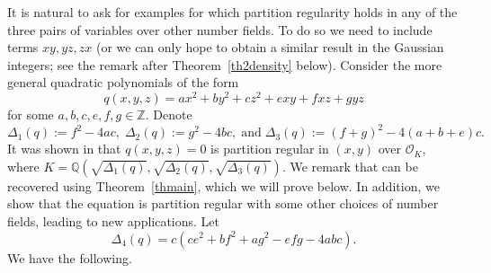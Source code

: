\documentclass[11pt]{amsart}
\newtheorem{corollary}[lemma]{Corollary}
\theoremstyle{definition}
\newcommand{\Q}{{\mathbb Q}}
\newcommand{\Z}{{\mathbb Z}}
\newcommand{\AK}[1]{{\color{ForestGreen}{{#1}}}}
\begin{document}
 




   
 It is natural to ask for examples for which partition regularity holds in any of the three pairs of variables over other number fields. To do so we need to include terms $xy,yz, zx$ (or we can only hope to obtain a similar result in the Gaussian integers; see the remark after Theorem~\ref{th2density} below). Consider the more general quadratic polynomials of the form
\begin{equation}\label{fp}
    q(x,y,z)=ax^{2}+by^{2}+cz^{2}+exy+fxz+gyz
\end{equation}
for some $a,b,c,e,f,g\in\Z$. Denote 
$$\Delta_{1}(q):=f^{2}-4ac,\; \Delta_{2}(q):=g^{2}-4bc,\;\text{and}\; \Delta_{3}(q):=(f+g)^{2}-4(a+b+e)c.$$
It was shown in \cite[Proposition~10.4]{S23} that $q(x,y,z)=0$ is partition regular in $(x,y)$ over $\mathcal{O}_{K}$, where $K=\Q(\sqrt{\Delta_{1}(q)},\sqrt{\Delta_{2}(q)},\sqrt{\Delta_{3}(q)})$. We remark that
\cite[Proposition~10.4]{S23} can be recovered using Theorem~\ref{thmain}, which we will prove below. In addition,
  we show that the equation is partition regular with some other choices of number fields, leading to new applications.
 Let $$\Delta_{4}(q)=c(ce^{2}+bf^{2}+ag^{2}-efg-4abc).$$
We have the following.

\end{document}
